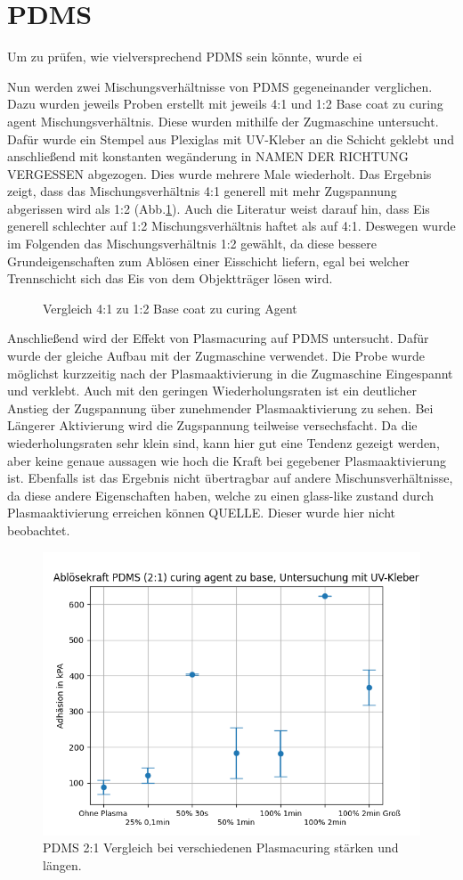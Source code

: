 \section{PDMS}

Um zu prüfen, wie vielversprechend PDMS sein könnte, wurde ei

Nun werden zwei Mischungsverhältnisse von PDMS gegeneinander verglichen. Dazu wurden jeweils Proben erstellt mit jeweils 4:1 und 1:2 Base coat zu curing agent Mischungsverhältnis. Diese wurden mithilfe der Zugmaschine untersucht. Dafür wurde ein Stempel aus Plexiglas mit UV-Kleber an die Schicht geklebt und anschließend mit konstanten wegänderung in NAMEN DER RICHTUNG VERGESSEN abgezogen. Dies wurde mehrere Male wiederholt. Das Ergebnis zeigt, dass das Mischungsverhältnis 4:1 generell mit mehr Zugspannung abgerissen wird als 1:2 (Abb.\ref{fig:vgl4:1zu1:2}). Auch die Literatur weist darauf hin, dass Eis generell schlechter auf 1:2 Mischungsverhältnis haftet als auf 4:1\cite{IbanezIbanez.2022}. Deswegen wurde im Folgenden das Mischungsverhältnis 1:2 gewählt, da diese bessere Grundeigenschaften zum Ablösen einer Eisschicht liefern, egal bei welcher Trennschicht sich das Eis von dem Objektträger lösen wird.


\begin{figure}
	\caption{Vergleich 4:1 zu 1:2 Base coat zu curing Agent}
	\label{fig:vgl4:1zu1:2}
\end{figure}

Anschließend wird der Effekt von Plasmacuring auf PDMS untersucht. Dafür wurde der gleiche Aufbau mit der Zugmaschine verwendet. Die Probe wurde möglichst kurzzeitig nach der Plasmaaktivierung in die Zugmaschine Eingespannt und verklebt. Auch mit den geringen Wiederholungsraten ist ein deutlicher Anstieg der Zugspannung über zunehmender Plasmaaktivierung zu sehen. Bei Längerer Aktivierung wird die Zugspannung teilweise versechsfacht. Da die wiederholungsraten sehr klein sind, kann hier gut eine Tendenz gezeigt werden, aber keine genaue aussagen wie hoch die Kraft bei gegebener Plasmaaktivierung ist. Ebenfalls ist das Ergebnis nicht übertragbar auf andere Mischunsverhältnisse, da diese andere Eigenschaften haben, welche zu einen glass-like zustand durch Plasmaaktivierung erreichen können QUELLE. Dieser wurde hier nicht beobachtet. 


\begin{figure}[h]
\includegraphics[width=14cm]{test}
\caption{PDMS 2:1 Vergleich bei verschiedenen Plasmacuring stärken und längen.}
\end{figure}




